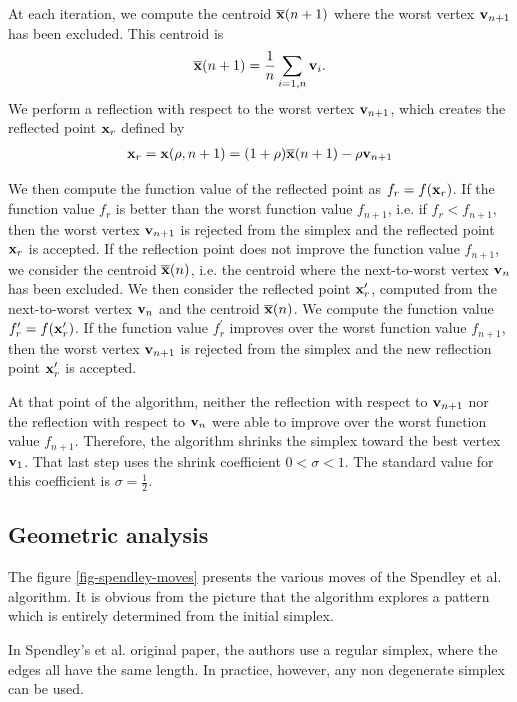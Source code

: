 At each iteration, we compute the centroid 
$\overline{\mathbf{x}} (n+1)$ where the worst vertex $\mathbf{v}_{n+1}$ 
has been excluded. This centroid is 
\begin{eqnarray}
\label{sp-centroid-worst}
\overline{\mathbf{x}} (n+1) = \frac{1}{n} \sum_{i=1,n} \mathbf{v}_i.
\end{eqnarray}
We perform a reflection with respect to the worst vertex $\mathbf{v}_{n+1}$,
which creates the reflected point $\mathbf{x}_r$ defined by 
\begin{eqnarray}
\label{sp-interpolate-worst}
\mathbf{x}_r = \mathbf{x}(\rho,n+1) = (1+\rho)\overline{\mathbf{x}}(n+1) - \rho \mathbf{v}_{n+1}
\end{eqnarray}

We then compute the function value of the reflected
point as $f_r=f(\mathbf{x}_r)$. If the function value $f_r$ is better than the worst function
value $f_{n+1}$, i.e. if $f_r < f_{n+1}$, then the worst vertex $\mathbf{v}_{n+1}$ is rejected from the 
simplex and the reflected point $\mathbf{x}_r$ is accepted. If the reflection point 
does not improve the function value $f_{n+1}$, we consider the centroid 
$\overline{\mathbf{x}} (n)$, i.e. the centroid where the next-to-worst vertex $\mathbf{v}_n$ has been excluded.
We then consider the reflected point $\mathbf{x}_r^\prime$, computed from the 
next-to-worst vertex $\mathbf{v}_n$ and the centroid $\overline{\mathbf{x}} (n)$. 
We compute the function value $f_r^\prime = f(\mathbf{x}_r^\prime)$. If the function
value $f_r^\prime$ improves over the worst function value $f_{n+1}$, then 
the worst vertex $\mathbf{v}_{n+1}$ is rejected from the simplex and the new reflection point 
$\mathbf{x}_r^\prime$ is accepted.

At that point of the algorithm, neither the reflection with respect to 
$\mathbf{v}_{n+1}$ nor the reflection with respect to $\mathbf{v}_n$ were able to improve over 
the worst function value $f_{n+1}$.
Therefore, the algorithm shrinks the simplex toward the best vertex $\mathbf{v}_1$.
That last step uses the shrink coefficient $0<\sigma<1$. The standard
value for this coefficient is $\sigma=\frac{1}{2}$.

\subsection{Geometric analysis}

The figure \ref{fig-spendley-moves} presents the various 
moves of the Spendley et al. algorithm. It is obvious from the 
picture that the algorithm explores a pattern which is 
entirely determined from the initial simplex.

In Spendley's et al. original paper, the authors use a regular 
simplex, where the edges all have the same length. In practice,
however, any non degenerate simplex can be used.

